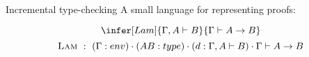 \documentclass[ignorenonframetext,red]{beamer}
\begin{document}
\begin{frame}{Incremental type-checking}
  A small language for representing proofs:
  \begin{example}
    \[ \infer[Lam]{\Gamma,A\vdash B}{\Gamma\vdash A\to B} \]
    \[ \textsc{Lam}\ :\ (\Gamma : env)\cdot(A B : type)\cdot
    (d : \Gamma,A\vdash B)\cdot \Gamma\vdash A\to B \]
  \end{example}
\end{frame}
\end{document}
